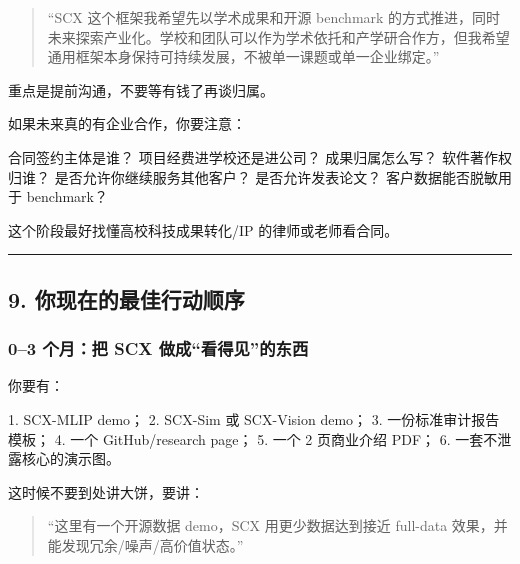 \documentclass[
  12pt,
]{ctexart}
\newenvironment{Shaded}{}{}
\newcommand{\NormalTok}[1]{#1}
\begin{document}
\begin{quote}
``SCX 这个框架我希望先以学术成果和开源 benchmark
的方式推进，同时未来探索产业化。学校和团队可以作为学术依托和产学研合作方，但我希望通用框架本身保持可持续发展，不被单一课题或单一企业绑定。''
\end{quote}

重点是提前沟通，不要等有钱了再谈归属。

如果未来真的有企业合作，你要注意：

\begin{Shaded}
\begin{Highlighting}[]
\NormalTok{合同签约主体是谁？}
\NormalTok{项目经费进学校还是进公司？}
\NormalTok{成果归属怎么写？}
\NormalTok{软件著作权归谁？}
\NormalTok{是否允许你继续服务其他客户？}
\NormalTok{是否允许发表论文？}
\NormalTok{客户数据能否脱敏用于 benchmark？}
\end{Highlighting}
\end{Shaded}

这个阶段最好找懂高校科技成果转化/IP 的律师或老师看合同。

\begin{center}\rule{0.5\linewidth}{0.5pt}\end{center}

\subsection{9.
你现在的最佳行动顺序}\label{ux4f60ux73b0ux5728ux7684ux6700ux4f73ux884cux52a8ux987aux5e8f}

\subsubsection{0--3 个月：把 SCX
做成``看得见''的东西}\label{ux4e2aux6708ux628a-scx-ux505aux6210ux770bux5f97ux89c1ux7684ux4e1cux897f}

你要有：

\begin{Shaded}
\begin{Highlighting}[]
\NormalTok{1. SCX{-}MLIP demo；}
\NormalTok{2. SCX{-}Sim 或 SCX{-}Vision demo；}
\NormalTok{3. 一份标准审计报告模板；}
\NormalTok{4. 一个 GitHub/research page；}
\NormalTok{5. 一个 2 页商业介绍 PDF；}
\NormalTok{6. 一套不泄露核心的演示图。}
\end{Highlighting}
\end{Shaded}

这时候不要到处讲大饼，要讲：

\begin{quote}
``这里有一个开源数据 demo，SCX 用更少数据达到接近 full-data
效果，并能发现冗余/噪声/高价值状态。''
\end{quote}
\end{document}
